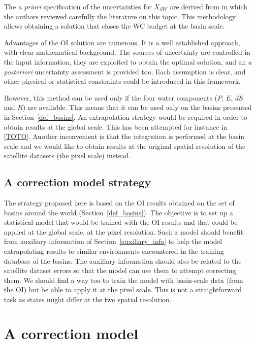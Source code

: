 \documentclass[draft]{agujournal2019}
\begin{document}
The {\it a priori} specification of the uncertainties for $X_{SW}$ are derived from \cite{Dorigo2021} in which the authors reviewed carefully the literature on this topic.
This methodology allows obtaining a solution that closes the WC budget at the basin scale.

Advantages of the OI solution are numerous. It is a well established approach, with clear mathematical background. 
The sources of uncertainty are controlled in the input information, they are exploited to obtain the optimal solution, and an {\it a posteriori} uncertainty assessment is provided too. 
Each assumption is clear, and other physical or statistical constraints could be introduced in this framework. 

However, this method can be used only if the four water components ($P$, $E$, $dS$ and $R$) are available. This means that it can be used only on the basins presented in Section~\ref{def_basins}. 
An extrapolation strategy would be required in order to obtain results at the global scale. This has been attempted for instance in \ref{TOTO}. 
Another inconvenient is that the integration is performed at the basin scale and we would like to obtain results at the original spatial resolution of the satellite datasets (the pixel scale) instead.

\subsection{A correction model strategy}

The strategy proposed here is based on the OI results obtained on the set of basins around the world (Section~\ref{def_basins}). 
The objective is to set up a statistical model that would be trained with the OI results and that could be applied at the global scale, at the pixel resolution. 
Such a model should benefit from auxiliary information of Section~\ref{auxiliary_info} to help the model extrapolating results to similar environments encountered in the training database of the basins. 
The auxiliary information should also be related to the satellite dataset errors so that the model can use them to attempt correcting them.
 We should find a way too to train the model with basin-scale data (from the OI) but be able to apply it at the pixel scale. 
This is not a straightforward task as states might differ at the two spatial resolution.



\section{A correction model}
\end{document}
